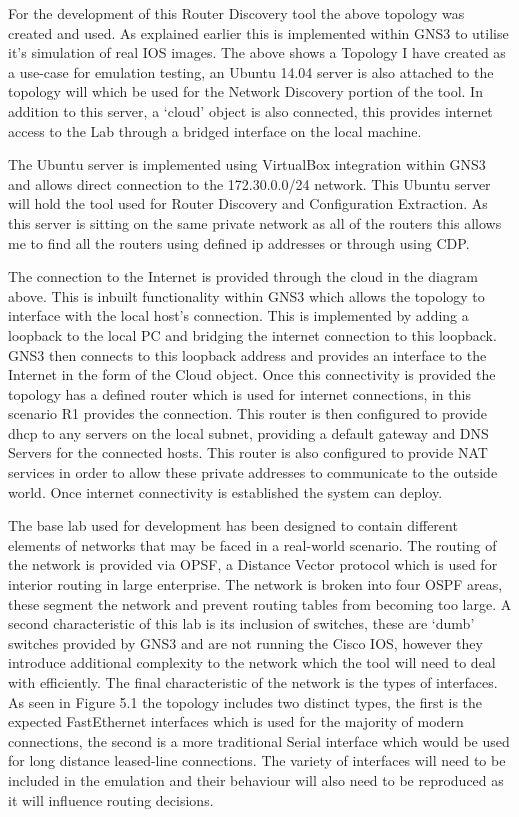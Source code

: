\documentclass[11pt]{report}
\begin{document}
For the development of this Router Discovery tool the above topology was created and used. As explained earlier this is implemented within GNS3 to utilise it's simulation of real IOS images. The above shows a Topology I have created as a use-case for emulation testing, an Ubuntu 14.04 server is also attached to the topology will which be used for the Network Discovery portion of the tool. In addition to this server, a `cloud' object is also connected, this provides internet access to the Lab through a bridged interface on the local machine.

The Ubuntu server is implemented using VirtualBox integration within GNS3 and allows direct connection to the 172.30.0.0/24 network. This Ubuntu server will hold the tool used for Router Discovery and Configuration Extraction. As this server is sitting on the same private network as all of the routers this allows me to find all the routers using defined ip addresses or through using CDP.

The connection to the Internet is provided through the cloud in the diagram above. This is inbuilt functionality within GNS3 which allows the topology to interface with the local host’s connection. This is implemented by adding a loopback to the local PC and bridging the internet connection to this loopback. GNS3 then connects to this loopback address and provides an interface to the Internet in the form of the Cloud object. Once this connectivity is provided the topology has a defined router which is used for internet connections, in this scenario R1 provides the connection. This router is then configured to provide dhcp to any servers on the local subnet, providing a default gateway and DNS Servers for the connected hosts. This router is also configured to provide NAT services in order to allow these private addresses to communicate to the outside world. Once internet connectivity is established the system can deploy.

The base lab used for development has been designed to contain different elements of networks that may be faced in a real-world scenario. The routing of the network is provided via OPSF, a Distance Vector protocol which is used for interior routing in large enterprise. The network is broken into four OSPF areas, these segment the network and prevent routing tables from becoming too large. A second characteristic of this lab is its inclusion of switches, these are `dumb' switches provided by GNS3 and are not running the Cisco IOS, however they introduce additional complexity to the network which the tool will need to deal with efficiently. The final characteristic of the network is the types of interfaces. As seen in Figure 5.1 the topology includes two distinct types, the first is the expected FastEthernet interfaces which is used for the majority of modern connections, the second is a more traditional Serial interface which would be used for long distance leased-line connections. The variety of interfaces will need to be included in the emulation and their behaviour will also need to be reproduced as it will influence routing decisions.
\end{document}
